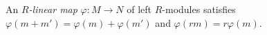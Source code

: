 
An \emph{$R$-linear map} $\varphi:M\to N$ of left $R$-modules satisfies $\varphi(m+m')=\varphi(m)+\varphi(m')$ and $\varphi(rm)=r\varphi(m)$.
